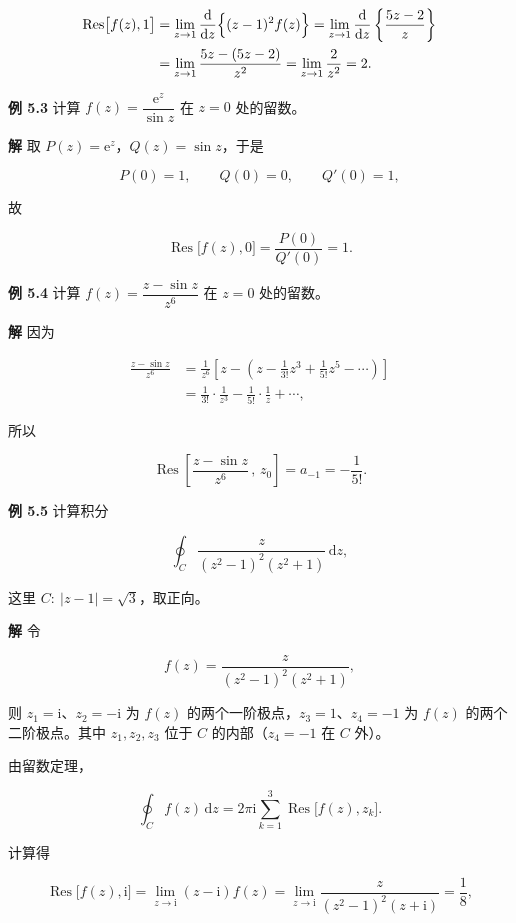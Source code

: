 \[
\begin{aligned}
\operatorname{Res}\bigl[f(z),1\bigr]
&=\lim_{z\to1}\frac{\mathrm d}{\mathrm dz}\Bigl\{(z-1)^{2}f(z)\Bigr\}
=\lim_{z\to1}\frac{\mathrm d}{\mathrm dz}\left\{\frac{5z-2}{z}\right\}\\
&=\lim_{z\to1}\frac{5z-(5z-2)}{z^{2}}
=\lim_{z\to1}\frac{2}{z^{2}}=2 .
\end{aligned}
\]

\textbf{例 5.3} 计算 \(f(z)=\dfrac{\mathrm e^{z}}{\sin z}\) 在 \(z=0\)
处的留数。

\textbf{解} 取 \(P(z)=\mathrm e^{z}\)，\(Q(z)=\sin z\)，于是

\[
P(0)=1,\qquad Q(0)=0,\qquad Q'(0)=1,
\]

故

\[
\operatorname{Res}\bigl[f(z),0\bigr]=\frac{P(0)}{Q'(0)}=1 .
\]

\textbf{例 5.4} 计算 \(f(z)=\dfrac{z-\sin z}{z^{6}}\) 在 \(z=0\)
处的留数。

\textbf{解} 因为

\[
\begin{aligned}
\frac{z-\sin z}{z^{6}}
&=\frac{1}{z^{6}}\left[z-\left(z-\frac{1}{3!}z^{3}+\frac{1}{5!}z^{5}-\cdots\right)\right]\\
&=\frac{1}{3!}\cdot\frac{1}{z^{3}}-\frac{1}{5!}\cdot\frac{1}{z}+\cdots,
\end{aligned}
\]

所以

\[
\operatorname{Res}\left[\frac{z-\sin z}{z^{6}}\,,\,z_0\right]=a_{-1}=-\frac{1}{5!}.
\]

\textbf{例 5.5} 计算积分

\[
\oint_C \frac{z}{(z^{2}-1)^{2}(z^{2}+1)}\,\mathrm dz,
\]

这里 \(C:\ |z-1|=\sqrt3\)，取正向。

\textbf{解} 令

\[
f(z)=\frac{z}{(z^{2}-1)^{2}(z^{2}+1)},
\]

则 \(z_1=\mathrm i\)、\(z_2=-\mathrm i\) 为 \(f(z)\)
的两个一阶极点，\(z_3=1\)、\(z_4=-1\) 为 \(f(z)\) 的两个二阶极点。其中
\(z_1,z_2,z_3\) 位于 \(C\) 的内部（\(z_4=-1\) 在 \(C\) 外）。

由留数定理，

\[
\oint_C f(z)\,\mathrm dz=2\pi\mathrm i\sum_{k=1}^{3}\operatorname{Res}\bigl[f(z),z_k\bigr].
\]

计算得

\[
\operatorname{Res}\bigl[f(z),\mathrm i\bigr]
=\lim_{z\to\mathrm i}(z-\mathrm i)f(z)
=\lim_{z\to\mathrm i}\frac{z}{(z^{2}-1)^{2}(z+\mathrm i)}
=\frac{1}{8},
\]

